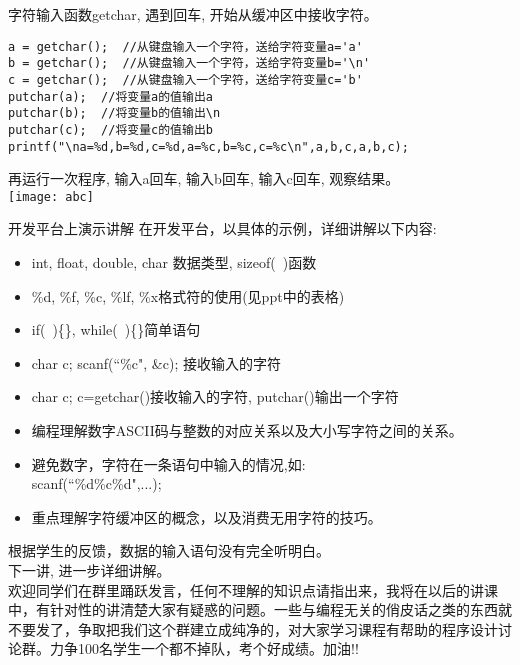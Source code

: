\begin{frame}[fragile]{字符输入函数getchar, 遇到回车, 开始从缓冲区中接收字符。}
\begin{lstlisting}
a = getchar();  //从键盘输入一个字符，送给字符变量a='a'
b = getchar();  //从键盘输入一个字符，送给字符变量b='\n'
c = getchar();  //从键盘输入一个字符，送给字符变量c='b'
putchar(a);  //将变量a的值输出a
putchar(b);  //将变量b的值输出\n 
putchar(c);  //将变量c的值输出b
printf("\na=%d,b=%d,c=%d,a=%c,b=%c,c=%c\n",a,b,c,a,b,c);
\end{lstlisting}
再运行一次程序, 输入a回车, 输入b回车, 输入c回车, 观察结果。\\
\texttt{[image: abc]}
\end{frame}

\begin{frame}{开发平台上演示讲解}
在开发平台，以具体的示例，详细讲解以下内容:
\begin{itemize}
	\item int, float, double, char 数据类型, sizeof(~)函数
	\item \%d, \%f, \%c, \%lf, \%x格式符的使用(见ppt中的表格)
	\item if(~)\{\quad\}, while(~)\{\quad\}简单语句
	\item char c; scanf(``\%c", \&c); 接收输入的字符
	\item char c; c=getchar()接收输入的字符, putchar()输出一个字符
	\item 编程理解数字ASCII码与整数的对应关系以及大小写字符之间的关系。
	\item 避免数字，字符在一条语句中输入的情况,如:\\ scanf(``\%d\%c\%d",...);
	\item 重点理解字符缓冲区的概念，以及消费无用字符的技巧。
\end{itemize}
\end{frame}

\note
{
根据学生的反馈，数据的输入语句没有完全听明白。 \\
下一讲, 进一步详细讲解。\\
欢迎同学们在群里踊跃发言，任何不理解的知识点请指出来，我将在以后的讲课中，有针对性的讲清楚大家有疑惑的问题。一些与编程无关的俏皮话之类的东西就不要发了，争取把我们这个群建立成纯净的，对大家学习课程有帮助的程序设计讨论群。力争100名学生一个都不掉队，考个好成绩。加油!!
}



